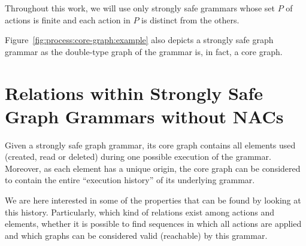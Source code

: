   



\begin{remark} Throughout this work, we will use only strongly safe grammars whose set $P$ of actions is finite and each action in $P$ is distinct from the others.

\end{remark}

\begin{example} Figure~\ref{fig:process:core-graph:example} also depicts a strongly safe graph grammar as the double-type graph of the grammar is, in fact, a core graph.
\end{example}

\section{Relations within Strongly Safe Graph Grammars without NACs}

Given a strongly safe graph grammar, its core graph contains all elements used (created, read or deleted) during one possible execution of the grammar. Moreover, as each element has a unique origin, the core graph can be considered to contain the entire ``execution history'' of its underlying grammar.

We are here interested in some of the properties that can be found by looking at this history. Particularly, which kind of relations exist among actions and elements, whether it is possible to find sequences in which all actions are applied and which graphs can be considered valid (reachable) by this grammar.

